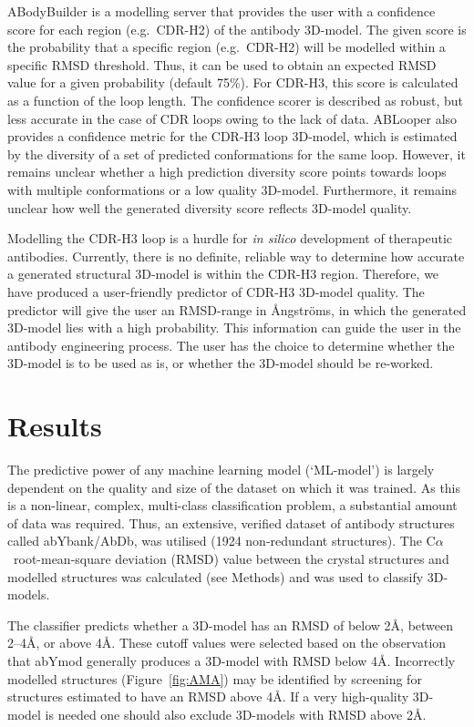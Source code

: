 \documentclass[12pt]{article}
\newcommand{\ca}{\mbox{C$\alpha$}}
\begin{document}
ABodyBuilder is a modelling server that provides the user with a
confidence score for each region (e.g.\ CDR-H2) of the antibody
3D-model. The given score is the probability that a specific region
(e.g.\ CDR-H2) will be modelled within a specific RMSD
threshold\cite{Leem2016}. Thus, it can be used to obtain an expected
RMSD value for a given probability (default 75\%). For CDR-H3, this
score is calculated as a function of the loop length.  The confidence
scorer is described as robust, but less accurate in the case of CDR
loops owing to the lack of data\cite{Leem2016}. ABLooper also provides a
confidence metric for the CDR-H3 loop 3D-model, which is estimated by the
diversity of a set of predicted conformations for the same
loop\cite{Abanades2022}. However, it remains unclear whether a high
prediction diversity score points towards loops with multiple
conformations or a low quality 3D-model. Furthermore, it remains unclear
how well the generated diversity score reflects 3D-model
quality\cite{Abanades2022}.


Modelling the CDR-H3 loop is a hurdle for \emph{in silico} development of
therapeutic antibodies. Currently, there is no definite, reliable way
to determine how accurate a generated structural 3D-model is within the
CDR-H3 region. Therefore, we have produced a
user-friendly predictor of CDR-H3 3D-model quality. The predictor will give
the user an RMSD-range in {\AA}ngstr\"{o}ms, in which the generated 3D-model lies
with a high probability.
This information can guide the
user in the antibody engineering process. The user has the choice to
determine whether the 3D-model is to be used as is, or
whether the 3D-model should be re-worked.

\section{Results}

The predictive power of any machine learning model (`ML-model') is largely
dependent on the quality and size of the dataset on which it was trained. As
this is a non-linear, complex, multi-class classification problem, a
substantial amount of data was required. Thus, an extensive, verified
dataset of antibody structures called abYbank/AbDb\cite{Ferdous2018},
was utilised (1924 non-redundant
structures). The \ca\ root-mean-square deviation (RMSD) value
between the crystal structures
and modelled structures was calculated (see Methods) and
was used to classify 3D-models.

The classifier predicts whether a 3D-model has an RMSD of below 2\AA,
between 2--4\AA, or above 4\AA. These cutoff values were selected
based on the observation that abYmod generally produces a 3D-model with
RMSD below 4\AA. Incorrectly modelled structures (Figure~\ref{fig:AMA}) may
be identified by screening for structures estimated to have an RMSD
above 4\AA. If a very high-quality 3D-model is needed one should also
exclude 3D-models with RMSD above 2\AA.
\end{document}
